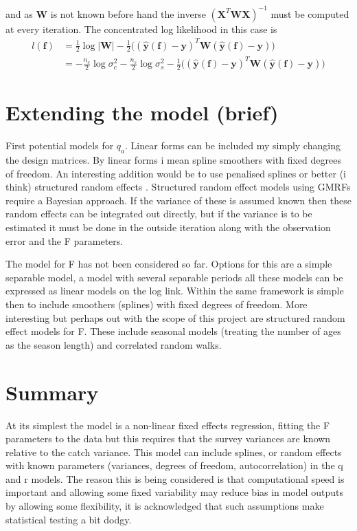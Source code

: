 \documentclass[a4paper,english]{article}
\begin{document}
and as $\bm{W}$ is not known before hand the inverse $(\bm{X}^T\bm{WX})^{-1}$ must be computed at every iteration.  The concentrated log likelihood in this case is
\begin{align*}
  l(\bm{f}) &= \frac{1}{2}\log|\bm{W}| -\frac{1}{2} \Big((\hat{\bm{y}}(\bm{f}) - \bm{y})^T\bm{W}(\hat{\bm{y}}(\bm{f}) - \bm{y})\Big) \\
            &= -\frac{n_c}{2}\log\sigma_c^2 - \frac{n_s}{2}\log\sigma_s^2 -\frac{1}{2} \Big((\hat{\bm{y}}(\bm{f}) - \bm{y})^T\bm{W}(\hat{\bm{y}}(\bm{f}) - \bm{y})\Big)
\end{align*}


\section{Extending the model (brief)}

First potential models for $q_a$.  Linear forms can be included my simply changing the design matrices.  By linear forms i mean spline smoothers with fixed degrees of freedom.  An interesting addition would be to use penalised splines or better (i think) structured random effects \citep[GMRFs i.e. 1st order and 2nd order random walks, see for example][]{Rue_Held.2005}.  Structured random effect models using GMRFs require a Bayesian approach.  If the variance of these is assumed known then these random effects can be integrated out directly, but if the variance is to be estimated it must be done in the outside iteration along with the observation error and the F parameters.

The model for F has not been considered so far.  Options for this are a simple separable model, a model with several separable periods all these models can be expressed as linear models on the log link.  Within the same framework is simple then to include smoothers (splines) with fixed degrees of freedom.  More interesting but perhaps out with the scope of this project are structured random effect models for F.  These include seasonal models (treating the number of ages as the season length) and correlated random walks.

\section{Summary}

At its simplest the model is a non-linear fixed effects regression, fitting the F parameters to the data but this requires that the survey variances are known relative to the catch variance.  This model can include splines, or random effects with known parameters (variances, degrees of freedom, autocorrelation) in the q and r models.  The reason this is being considered is that computational speed is important and allowing some fixed variability may reduce bias in model outputs by allowing some flexibility, it is acknowledged that such assumptions make statistical testing a bit dodgy.
\end{document}
